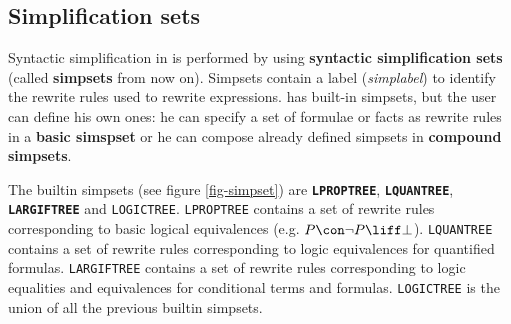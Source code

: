 \subsection{Simplification sets}
\label{sec-rew-simpset}

Syntactic simplification in {\GF} is performed by using 
{\bf syntactic simplification sets} (called {\bf simpsets} from now on).
Simpsets contain a label ({\em simplabel}) to identify the
rewrite rules used to rewrite expressions.
{\GF} has built-in simpsets, but the user can define his own ones: he can specify a 
set of formulae or facts as rewrite rules in a {\bf basic simspset}
or he can compose already defined simpsets in {\bf compound simpsets}.

The {{\GF}} builtin simpsets (see figure \ref{fig-simpset}) are
{\bf \tt LPROPTREE}, {\bf \tt LQUANTREE}, {\bf \tt LARGIFTREE} and 
{\tt LOGICTREE}.
{\tt LPROPTREE} contains a set of rewrite rules 
corresponding to basic logical equivalences (e.g. $P\con\neg P\liff \bot$). 
{\tt LQUANTREE} contains a set of rewrite rules 
corresponding to logic equivalences for quantified formulas.
{\tt LARGIFTREE} contains a set of rewrite rules corresponding to logic
equalities and equivalences for conditional terms and formulas.
{\tt LOGICTREE} is the union of all the previous builtin simpsets.

\newpage

